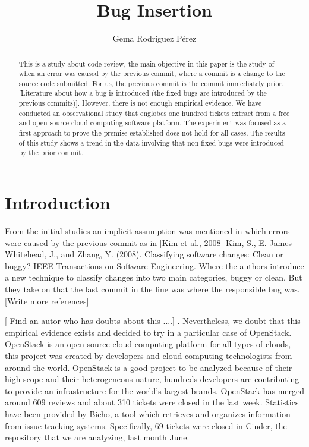 \documentclass[a4paper]{article}
\title{Bug Insertion}
\author{Gema Rodríguez Pérez}
\date{}
\begin{document}
\maketitle

\begin{abstract}
This is a study about code review, the main objective in this paper is the study of when an error was caused by the previous commit, where a commit is a change to the source code submitted. For us, the previous commit is the commit immediately prior. [Literature about how a bug is introduced (the fixed bugs are introduced by the previous commits)]. However, there is not enough empirical evidence. We have conducted an observational study that englobes one hundred tickets extract from a free and open-source cloud computing software platform. The experiment was focused as a first approach to prove the premise established does not hold for all cases. The results of this study shows a trend in the data involving that non fixed bugs were introduced by the prior commit. 

\end{abstract}

\section{Introduction}

From the initial studies an implicit assumption was mentioned in which errors were caused by the previous commit as in [Kim et al., 2008] Kim, S., E. James Whitehead, J., and Zhang, Y. (2008). Classifying software changes: Clean or buggy? IEEE Transactions on Software Engineering. Where the authors introduce a new technique to classify changes into two main categories, buggy or clean. But they take on that the last commit in the line was where the responsible bug was. [Write more references]

[ Find an autor who has doubts about this ....] . Nevertheless, we doubt that this empirical evidence exists and decided to try in a particular case of OpenStack. OpenStack is an open source cloud computing platform for all types of clouds, this project was created by developers and cloud computing technologists from around the world. OpenStack is a good project to be analyzed because of their high scope and their heterogeneous nature, hundreds developers are contributing to provide an infrastructure for the world's largest brands. OpenStack has merged around 609 reviews and about 310 tickets were closed in the last week. Statistics have been provided by Bicho, a tool which retrieves and organizes information from issue tracking systems. Specifically, 69 tickets were closed in Cinder, the repository that we are analyzing, last month June. 
\end{document}

